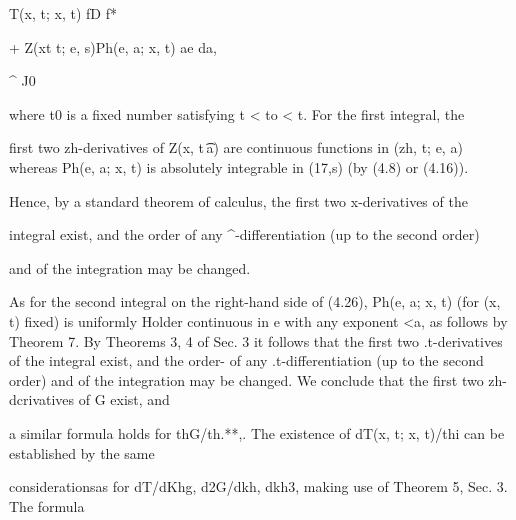 T(x, t; x, t) fD f*

\begin{ocrformula}
+                       Z(xt t; e, s)Ph(e, a; x, t) ae da,
\end{ocrformula}

\textasciicircum{} J0

where t0 is a fixed number satisfying t < to < t. For the first integral, the

\begin{ocrformula}
first two zh-derivatives of Z(x, t\t\,a) are continuous functions in (zh, t; e, a)
whereas    Ph(e, a; x, t) is absolutely   integrable in (17,s) (by (4.8) or (4.16)).
\end{ocrformula}

Hence, by a standard theorem of calculus, the first two x-derivatives of the

\begin{ocrformula}
integral exist, and the order of any ^-differentiation (up to the second order)
\end{ocrformula}

and of the integration may be changed.

\begin{ocrformula}
As for the second integral on the right-hand      side of (4.26), Ph(e, a; x, t)
(for (x, t) fixed) is uniformly   Holder  continuous    in e with any exponent
<a, as follows by Theorem       7. By Theorems     3, 4 of Sec. 3 it follows that
the first two .t-derivatives of the integral exist, and the order- of any
.t-differentiation (up to the second     order) and of the integration       may
be changed.         We     conclude     that the first two                   zh-dcrivatives    of G exist, and
\end{ocrformula}

\begin{ocrformula}
a similar formula           holds for thG/th.**,.
The     existence       of dT(x, t; x, t)/thi can            be established          by the same
\end{ocrformula}

considerationsas for dT/dKhg, d2G/dkh, dkh3, making use of Theorem 5, Sec. 3. The formula

\begin{ocrformula}
*' T) =                                                      >> ')
(4.28)                                               +                                       Ph(,,, ,,; {, r) d, da
^Xl                      **ipsL                 /'* l         *Z<'^
\end{ocrformula}

